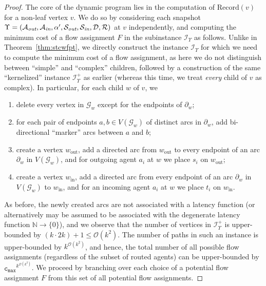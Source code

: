 \documentclass[letterpaper]{article} %
\newcommand{\bigoh}{\ensuremath{{\mathcal O}}}
\newcommand{\cmax}{\mathtt{c_{max}}}
\newcommand{\forgottenG}{\mathcal{G}}
\newcommand{\Rec}{\text{Record}}
\renewcommand{\R}{\mathcal{R}}
\renewcommand{\D}{\mathcal{D}}
\newcommand{\Sout}{\mathcal{S}_\emph{out}}
\newcommand{\Sin}{\mathcal{S}_\emph{in}}
\newcommand{\Aout}{\mathcal{A}_\emph{out}}
\newcommand{\Ain}{\mathcal{A}_\emph{in}}
\begin{document}
\begin{proof}
The core of the dynamic program lies in the computation of $\Rec(v)$ for a non-leaf vertex $v$. We do so by considering each snapshot $\Upsilon=(\Aout,\Ain,\alpha',\Sout,\Sin,\D,\R)$ at $v$ independently, and computing the minimum cost of a flow assignment $F$ in the subinstance $\mathcal{I}_\Upsilon$ as follows. Unlike in Theorem~\ref{thm:stcwfpt}, we directly construct the instance $\mathcal{I}_\Upsilon$ for which we need to compute the minimum cost of a flow assignment, as here we do not distinguish between ``simple'' and ``complex'' children, followed by a construction of the same ``kernelized'' instance $\mathcal{I}^+_\Upsilon$ as earlier (whereas this time, we treat \emph{every} child of $v$ as complex).
In particular, for each child $w$ of $v$, we
\begin{enumerate}
\item delete every vertex in $\forgottenG_w$ except for the endpoints of $\partial_w$;
\item for each pair of endpoints $a,b\in V(\forgottenG_w)$ of distinct arcs in $\partial_w$, add bi-directional ``marker'' arcs between $a$ and $b$;
\item create a vertex $w_\text{out}$, add a directed arc from $w_\text{out}$ to every endpoint of an arc $\partial_w$ in $V(\forgottenG_w)$, and for outgoing agent $a_i$ at $w$ we place $s_i$ on $w_\text{out}$;
\item create a vertex $w_\text{in}$, add a directed arc from every endpoint of an arc $\partial_w$ in $V(\forgottenG_w)$ to $w_\text{in}$, and for an incoming agent $a_i$ at $w$ we place $t_i$ on $w_\text{in}$.
\end{enumerate}

As before, the newly created arcs are not associated with a latency function (or alternatively may be assumed to be associated with the degenerate latency function $\mathbb{N}\rightarrow \{0\}$), and we observe that the number of vertices in $\mathcal{I}^+_\Upsilon$ is upper-bounded by $(k\cdot 2k)+1\leq \bigoh(k^2)$. The number of paths in such an instance is upper-bounded by $k^{\bigoh(k^2)}$, and hence, the total number of all possible flow assignments (regardless of the subset of routed agents) can be upper-bounded by $\cmax^{k^{\bigoh(k^2)}}$. We proceed by branching over each choice of a potential flow assignment $F$ from this set of all potential flow assignments.


\end{proof}
\end{document}
